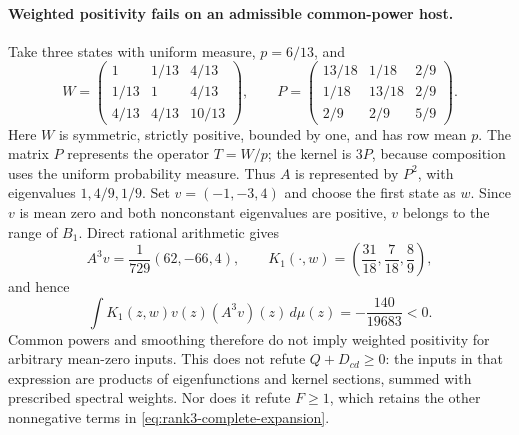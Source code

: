 \paragraph{Weighted positivity fails on an admissible common-power host.}
Take three states with uniform measure, $p=6/13$, and
\[
 W=\begin{pmatrix}
 1&1/13&4/13\\
 1/13&1&4/13\\
 4/13&4/13&10/13
 \end{pmatrix},\qquad
 P=\begin{pmatrix}
 13/18&1/18&2/9\\
 1/18&13/18&2/9\\
 2/9&2/9&5/9
 \end{pmatrix}.
\]
Here $W$ is symmetric, strictly positive, bounded by one, and has row
mean $p$.  The matrix $P$ represents the operator $T=W/p$;
the kernel is $3P$, because composition uses the uniform probability
measure.  Thus $A$ is represented by $P^2$, with eigenvalues
$1,4/9,1/9$.  Set $v=(-1,-3,4)$ and choose the first state as $w$.
Since $v$ is mean zero and both nonconstant eigenvalues are positive,
$v$ belongs to the range of $B_1$.
Direct rational arithmetic gives
\[
 A^3v=\frac1{729}(62,-66,4),\qquad
 K_1(\cdot,w)=\left(\frac{31}{18},\frac7{18},\frac89\right),
\]
and hence
\[
 \int K_1(z,w)v(z)(A^3v)(z)\,d\mu(z)
       =-\frac{140}{19683}<0.
\]
Common powers and smoothing therefore do not imply weighted positivity
for arbitrary mean-zero inputs.  This does not refute $Q+D_{cd}\geq0$:
the inputs in that expression are products of eigenfunctions and kernel
sections, summed with prescribed spectral weights.  Nor does it refute
$F\geq1$, which retains the other nonnegative terms in
\eqref{eq:rank3-complete-expansion}.


